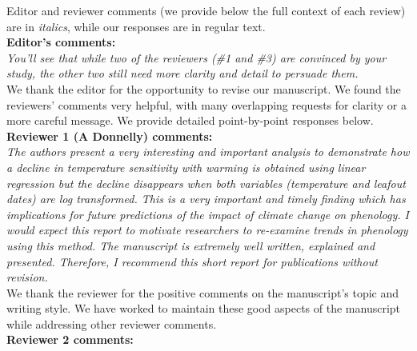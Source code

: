 \documentclass[11pt]{article}
\begin{document}
Editor and reviewer comments (we provide below the full context of each review) are in \emph{italics}, while our responses are in regular text. \\ %

{\bf Editor's comments:} \\

\emph{You'll see that while two of the reviewers (\#1 and \#3) are convinced by your study, the other two still need more clarity and detail to persuade them.}\\

We thank the editor for the opportunity to revise our manuscript. We found the reviewers' comments very helpful, with many overlapping requests for clarity or a more careful message. We provide detailed point-by-point responses below.\\

{\bf Reviewer 1 (A Donnelly) comments:} \\

\emph{The authors present a very interesting and important analysis to demonstrate how a decline in temperature sensitivity with warming is obtained using linear regression but the decline disappears when both variables (temperature and leafout dates) are log transformed. This is a very important and timely finding which has implications for future predictions of the impact of climate change on phenology. I would expect this report to motivate researchers to re-examine trends in phenology using this method. The manuscript is extremely well written, explained and presented. Therefore, I recommend this short report for publications without revision.}\\

We thank the reviewer for the positive comments on the manuscript's topic and writing style. We have worked to maintain these good aspects of the manuscript while addressing other reviewer comments. \\

{\bf Reviewer 2 comments:} \\
\end{document}
